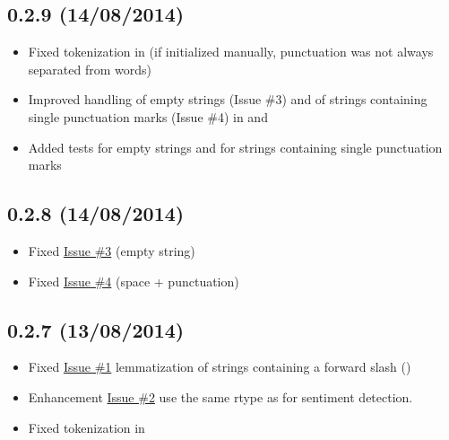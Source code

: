 \documentclass[letterpaper,10pt,english]{sphinxmanual}
\begin{document}
\subsection{0.2.9 (14/08/2014)}
\label{changelog:id5}\begin{itemize}
\item {} 
Fixed tokenization in  (if initialized manually, punctuation was not always separated from words)

\item {} 
Improved handling of empty strings (Issue \#3) and of strings containing single punctuation marks (Issue \#4) in  and 

\item {} 
Added tests for empty strings and for strings containing single punctuation marks

\end{itemize}


\subsection{0.2.8 (14/08/2014)}
\label{changelog:id6}\begin{itemize}
\item {} 
Fixed \href{https://github.com/markuskiller/textblob-de/issues/3}{Issue \#3} (empty string)

\item {} 
Fixed \href{https://github.com/markuskiller/textblob-de/issues/4}{Issue \#4} (space + punctuation)

\end{itemize}


\subsection{0.2.7 (13/08/2014)}
\label{changelog:id7}\begin{itemize}
\item {} 
Fixed \href{https://github.com/markuskiller/textblob-de/issues/1}{Issue \#1} lemmatization of strings containing a forward slash (\code{/})

\item {} 
Enhancement \href{https://github.com/markuskiller/textblob-de/issues/2}{Issue \#2} use the same rtype as  for sentiment detection.

\item {} 
Fixed tokenization in 

\end{itemize}
\end{document}

